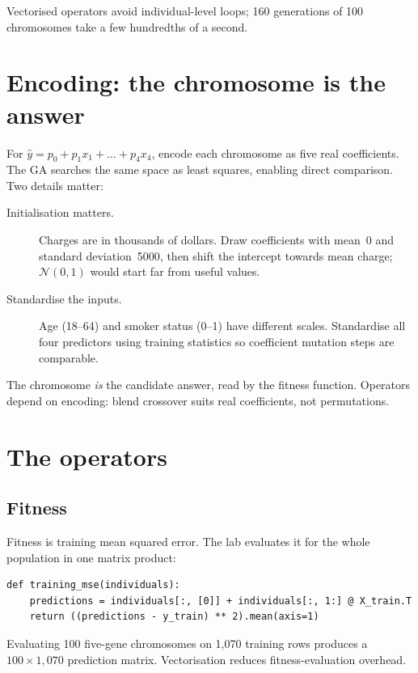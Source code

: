 Vectorised operators avoid individual-level loops; 160 generations of 100 chromosomes take a few hundredths of a second.

\section{Encoding: the chromosome is the answer}

For $\hat y=p_0+p_1x_1+\dots+p_4x_4$, encode each chromosome as five real coefficients. The GA searches the same space as least squares, enabling direct comparison. Two details matter:

\begin{description}
  \item[Initialisation matters.] Charges are in thousands of dollars. Draw coefficients with mean~0 and standard deviation~5000, then shift the intercept towards mean charge; $\mathcal N(0,1)$ would start far from useful values.
  \item[Standardise the inputs.] Age (18--64) and smoker status (0--1) have different scales. Standardise all four predictors using training statistics so coefficient mutation steps are comparable.
\end{description}

\begin{intuition}
The chromosome \emph{is} the candidate answer, read by the fitness function. Operators depend on encoding: blend crossover suits real coefficients, not permutations.
\end{intuition}

\section{The operators}

\subsection{Fitness}

Fitness is training mean squared error. The lab evaluates it for the whole population in one matrix product:

\begin{lstlisting}[style=aipython]
def training_mse(individuals):
    predictions = individuals[:, [0]] + individuals[:, 1:] @ X_train.T
    return ((predictions - y_train) ** 2).mean(axis=1)
\end{lstlisting}

Evaluating 100 five-gene chromosomes on 1,070 training rows produces a $100\times1{,}070$ prediction matrix. Vectorisation reduces fitness-evaluation overhead.

